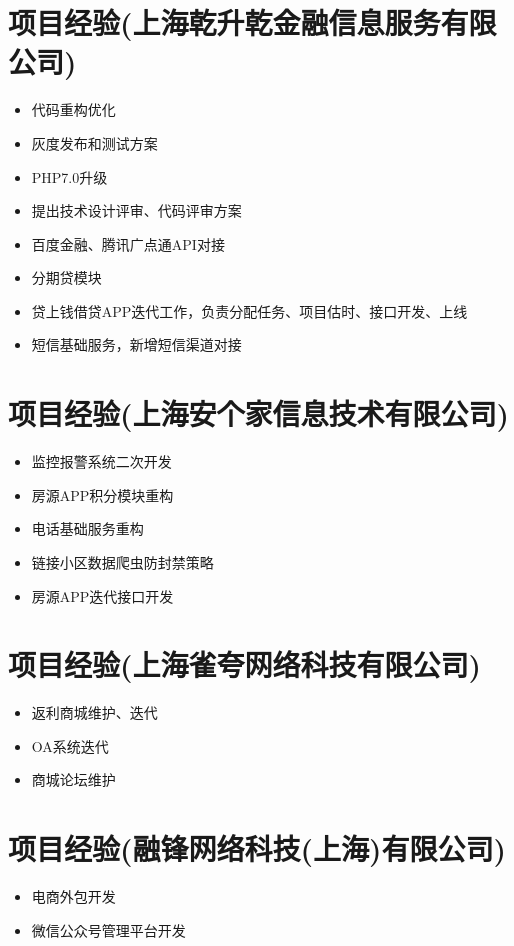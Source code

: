 \documentclass[a4paper,12pt]{article}
\begin{document}
\begin{CJK}{UTF8}{gbsn}
		\section{项目经验(上海乾升乾金融信息服务有限公司)}
			\begin{itemize}
				\item{代码重构优化}
				\item{灰度发布和测试方案}
                			\item{PHP7.0升级}
                			\item{提出技术设计评审、代码评审方案} 
				\item{百度金融、腾讯广点通API对接}
				\item{分期贷模块}
				\item{贷上钱借贷APP迭代工作，负责分配任务、项目估时、接口开发、上线}
				\item{短信基础服务，新增短信渠道对接}
			\end{itemize}
			
		\section{项目经验(上海安个家信息技术有限公司)}
			\begin{itemize}
				\item{监控报警系统二次开发}
				\item{房源APP积分模块重构}
				\item{电话基础服务重构}
				\item{链接小区数据爬虫防封禁策略}
				\item{房源APP迭代接口开发}
			\end{itemize}
		
		\section{项目经验(上海雀夸网络科技有限公司)}
			\begin{itemize}
				\item{返利商城维护、迭代}
				\item{OA系统迭代}
				\item{商城论坛维护}
			\end{itemize}
			
		\section{项目经验(融锋网络科技(上海)有限公司)}
			\begin{itemize}
				\item{电商外包开发}
				\item{微信公众号管理平台开发}
			\end{itemize}
		

\end{CJK}
\end{document}
